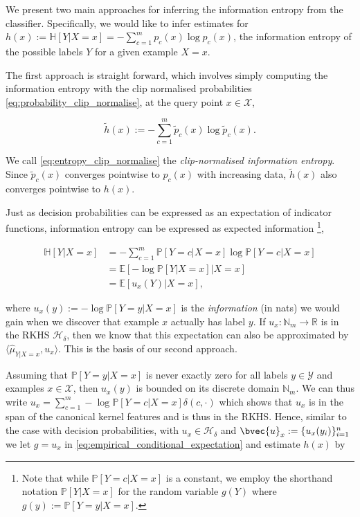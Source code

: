 \documentclass{article}
\begin{document}
	We present two main approaches for inferring the information entropy from the classifier. Specifically, we would like to infer estimates for $h(x) := \mathbb{H}[Y | X = x] = - \sum_{c = 1}^{m} p_{c}(x) \log{p_{c}(x)} $, the information entropy of the possible labels $Y$ for a given example $X = x$.
	
	The first approach is straight forward, which involves simply computing the information entropy with the clip normalised probabilities \eqref{eq:probability_clip_normalise}, at the query point $x \in \mathcal{X}$,
	
	\begin{equation}
		\tilde{h}(x) := - \sum_{c = 1}^{m} \tilde{p}_{c}(x) \log{\tilde{p}_{c}(x)}.
	\label{eq:entropy_clip_normalise}
	\end{equation}
	
	We call \eqref{eq:entropy_clip_normalise} the \textit{clip-normalised information entropy}. Since $\tilde{p}_{c}(x)$ converges pointwise to $p_{c}(x)$ with increasing data, $\tilde{h}(x)$ also converges pointwise to $h(x)$.
	
	Just as decision probabilities can be expressed as an expectation of indicator functions, information entropy can be expressed as expected information \footnote{Note that while $\mathbb{P}[Y = c | X = x]$ is a constant, we employ the shorthand notation $\mathbb{P}[Y| X = x]$ for the random variable $g(Y)$ where $g(y) := \mathbb{P}[Y = y | X = x]$.},
	
	\begin{equation}
	\begin{aligned}
		\mathbb{H}[Y | X = x] &= - \sum_{c = 1}^{m} \mathbb{P}[Y = c| X = x] \log{\mathbb{P}[Y = c | X = x]} \\
		&= \mathbb{E}[- \log{\mathbb{P}[Y | X = x]} | X = x] \\
		&= \mathbb{E}[u_{x}(Y) | X = x],
	\end{aligned}
	\end{equation}
	
	where $u_{x}(y) := - \log{\mathbb{P}[Y = y | X = x]}$ is the \textit{information} (in nats) we would gain when we discover that example $x$ actually has label $y$. If $u_{x} : \mathbb{N}_{m} \to \mathbb{R}$ is in the RKHS $\mathcal{H}_{\delta}$, then we know that this expectation can also be approximated by $\langle \hat{\mu}_{Y | X = x}, u_{x} \rangle$. This is the basis of our second approach.
	
	Assuming that $\mathbb{P}[Y = y | X = x]$ is never exactly zero for all labels $y \in \mathcal{Y}$ and examples $x \in \mathcal{X}$, then $u_{x}(y)$ is bounded on its discrete domain $\mathbb{N}_{m}$. We can thus write $u_{x} = \sum_{c = 1}^{m} - \log{\mathbb{P}[Y = c | X = x]} \delta(c, \cdot)$ which shows that $u_{x}$ is in the span of the canonical kernel features and is thus in the RKHS. Hence, similar to the case with decision probabilities, with $u_{x} \in \mathcal{H}_{\delta}$ and $\bvec{u}_{x} := \{u_{x}(y_{i})\}_{i = 1}^{n}$ we let $g = u_{x}$ in \eqref{eq:empirical_conditional_expectation} and estimate $h(x)$ by
	
\end{document}
